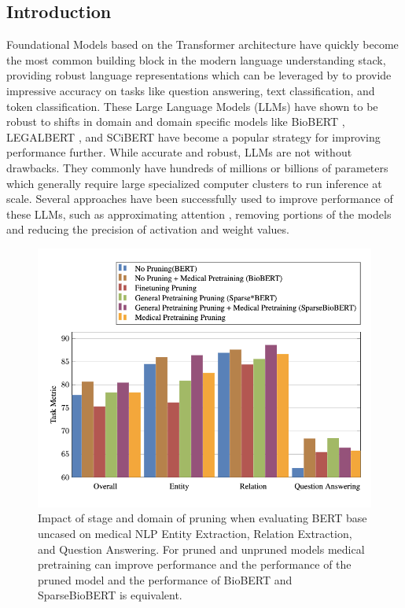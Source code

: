 \subsection{Introduction}
Foundational Models \cite{Bommasani2021OnTO} based on the Transformer architecture \cite{Vaswani2017AttentionIA} have quickly become the most common building block in the modern language understanding stack, providing robust language representations which can be leveraged by to provide impressive accuracy on tasks like question answering, text classification, and token classification. These Large Language Models (LLMs) have shown to be robust to shifts in domain and domain specific models like BioBERT \cite{Lee2020BioBERTAP}, LEGALBERT \cite{Chalkidis2020LEGALBERTTM}, and SCiBERT \cite{beltagy2019SciBERTAP} have become a popular strategy for improving performance further. While accurate and robust, LLMs are not without drawbacks. They commonly have hundreds of millions or billions of parameters which generally require large specialized computer clusters to run inference at scale. Several approaches have been successfully used to improve performance of these LLMs, such as approximating attention \cite{Peng2021RandomFA}, removing portions of the models \cite{Sridhar2020UndividedAA} and reducing the precision of activation and weight values.\\
\begin{figure}[!
t]
    \centering
    \includegraphics[scale=0.8
    ]{media-sparse/sparseBIO-figure1.png}
    \vspace{-1.2em}
\caption{Impact of stage and domain of pruning when evaluating BERT base uncased on medical NLP Entity Extraction, Relation Extraction, and Question Answering. For pruned and unpruned models medical pretraining can improve performance and the performance of the pruned model and the performance of BioBERT and SparseBioBERT is equivalent.}
\label{fig:sparse_transfer_categorical}
\end{figure}
